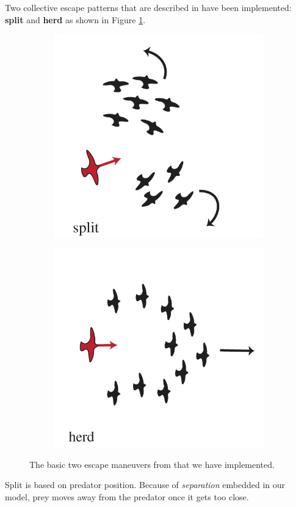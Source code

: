 \documentclass[9pt]{pnas-new}
\begin{document}
Two collective escape patterns that are described in \cite{papadopoulou2022emergence} have been implemented: \textbf{split}
and \textbf{herd} as shown in Figure \ref{fig:escape_maneuvers}.
\begin{figure}[h]
    \centering
	\begin{subfigure}[t]{.45\textwidth}
        \centering
		\includegraphics[width=0.6\linewidth]{article_split.png}
    \end{subfigure}%
    \hspace{.5cm} %
    \begin{subfigure}[t]{.45\textwidth}
        \centering
		\includegraphics[width=0.6\linewidth]{article_herd.png}
    \end{subfigure}
    \caption{The basic two escape maneuvers from \cite{papadopoulou2022emergence} that we have implemented.}
	\label{fig:escape_maneuvers}
\end{figure}

Split is based on predator position. Because of \textit{separation} embedded in our model, prey moves away from the
predator once it gets too close.
\end{document}
